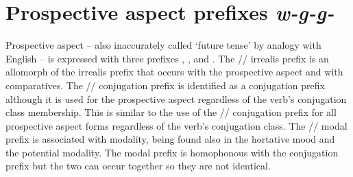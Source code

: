 \documentclass[12pt,letterpaper,landscape,oneside,article]{memoir}
\begin{document}
\section{Prospective aspect prefixes \textit{w-g-g̱-}}

\begin{multicols}{2}
\noindent
Prospective aspect – also inaccurately called ‘future tense’ by analogy with English – is expressed with three prefixes , , and .
The  // irrealis prefix is an allomorph of the irrealis prefix that occurs with the prospective aspect and with comparatives.
The  // conjugation prefix is identified as a conjugation prefix although it is used for the prospective aspect regardless of the verb’s conjugation class membership.
This is similar to the use of the  // conjugation prefix for all prospective aspect forms regardless of the verb’s conjugation class.
The  // modal prefix is associated with modality, being found also in the hortative mood and the potential modality.
The  modal prefix is homophonous with the  conjugation prefix but the two can occur together so they are not identical.
\end{multicols}
\end{document}
